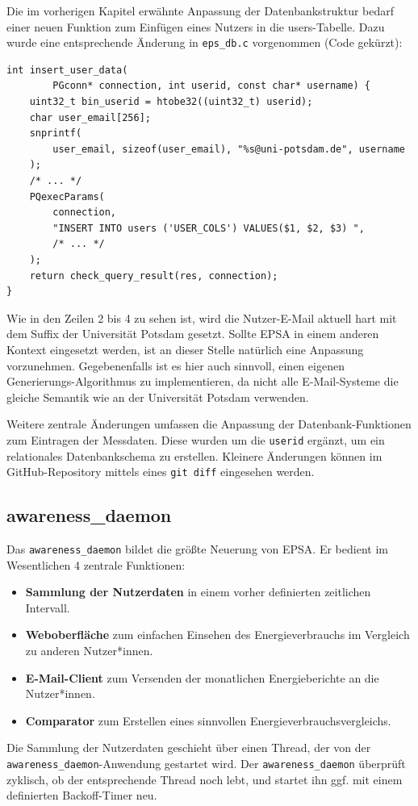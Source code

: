 \documentclass[paper=a4, fontsize=11pt]{scrartcl} %
\numberwithin{equation}{section} %
\numberwithin{figure}{section} %
\numberwithin{table}{section} %
\begin{document}
Die im vorherigen Kapitel erwähnte Anpassung der Datenbankstruktur bedarf einer neuen Funktion zum Einfügen eines Nutzers in die users-Tabelle. Dazu wurde eine entsprechende Änderung in \texttt{eps\_db.c} vorgenommen (Code gekürzt):
\begin{verbatim}
int insert_user_data(
        PGconn* connection, int userid, const char* username) {
    uint32_t bin_userid = htobe32((uint32_t) userid);
    char user_email[256];
    snprintf(
        user_email, sizeof(user_email), "%s@uni-potsdam.de", username
    );
    /* ... */
    PQexecParams(
        connection,
        "INSERT INTO users ('USER_COLS') VALUES($1, $2, $3) ",
        /* ... */
    );
    return check_query_result(res, connection);
}
\end{verbatim}
Wie in den Zeilen 2 bis 4 zu sehen ist, wird die Nutzer-E-Mail aktuell hart mit dem Suffix der Universität Potsdam gesetzt. Sollte EPSA in einem anderen Kontext eingesetzt werden, ist an dieser Stelle natürlich eine Anpassung vorzunehmen. Gegebenenfalls ist es hier auch sinnvoll, einen eigenen Generierungs-Algorithmus zu implementieren, da nicht alle E-Mail-Systeme die gleiche Semantik wie an der Universität Potsdam verwenden.

Weitere zentrale Änderungen umfassen die Anpassung der Datenbank-Funktionen zum Eintragen der Messdaten. Diese wurden um die \texttt{userid} ergänzt, um ein relationales Datenbankschema zu erstellen.
Kleinere Änderungen können im GitHub-Repository mittels eines \texttt{git diff} eingesehen werden.
\newpage
\subsection{awareness\_daemon}
Das \texttt{awareness\_daemon} bildet die größte Neuerung von EPSA. Er bedient im Wesentlichen 4 zentrale Funktionen:
\begin{itemize}
    \item \textbf{Sammlung der Nutzerdaten} in einem vorher definierten zeitlichen Intervall.
    \item \textbf{Weboberfläche} zum einfachen Einsehen des Energieverbrauchs im Vergleich zu anderen Nutzer*innen.
    \item \textbf{E-Mail-Client} zum Versenden der monatlichen Energieberichte an die Nutzer*innen.
    \item \textbf{Comparator} zum Erstellen eines sinnvollen Energieverbrauchsvergleichs.
\end{itemize}
Die Sammlung der Nutzerdaten geschieht über einen Thread, der von der \texttt{awareness\_daemon}-Anwendung gestartet wird. Der \texttt{awareness\_daemon} überprüft zyklisch, ob der entsprechende Thread noch lebt, und startet ihn ggf. mit einem definierten Backoff-Timer neu.
\end{document}
